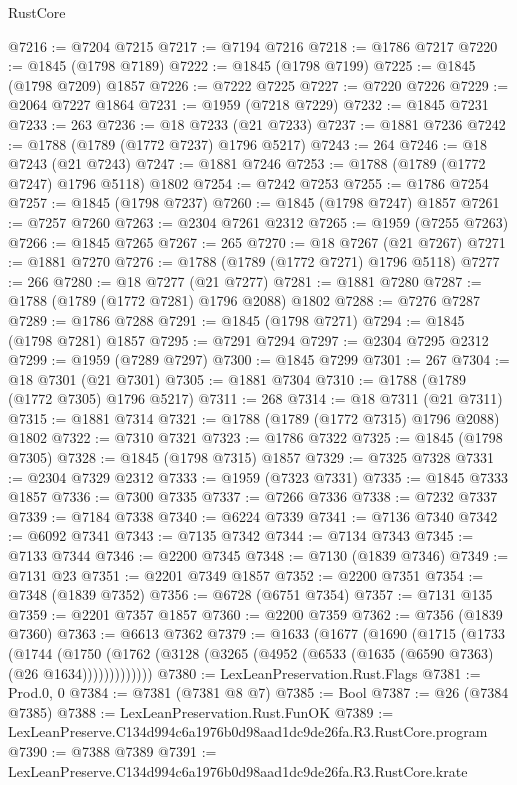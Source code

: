 \begin{lexlean}{RustCore}
\begin{coremodule}
@7216 := @7204 @7215
@7217 := @7194 @7216
@7218 := @1786 @7217
@7220 := @1845 (@1798 @7189)
@7222 := @1845 (@1798 @7199)
@7225 := @1845 (@1798 @7209) @1857
@7226 := @7222 @7225
@7227 := @7220 @7226
@7229 := @2064 @7227 @1864
@7231 := @1959 (@7218 @7229)
@7232 := @1845 @7231
@7233 := 263
@7236 := @18 @7233 (@21 @7233)
@7237 := @1881 @7236
@7242 := @1788 (@1789 (@1772 @7237) @1796 @5217)
@7243 := 264
@7246 := @18 @7243 (@21 @7243)
@7247 := @1881 @7246
@7253 := @1788 (@1789 (@1772 @7247) @1796 @5118) @1802
@7254 := @7242 @7253
@7255 := @1786 @7254
@7257 := @1845 (@1798 @7237)
@7260 := @1845 (@1798 @7247) @1857
@7261 := @7257 @7260
@7263 := @2304 @7261 @2312
@7265 := @1959 (@7255 @7263)
@7266 := @1845 @7265
@7267 := 265
@7270 := @18 @7267 (@21 @7267)
@7271 := @1881 @7270
@7276 := @1788 (@1789 (@1772 @7271) @1796 @5118)
@7277 := 266
@7280 := @18 @7277 (@21 @7277)
@7281 := @1881 @7280
@7287 := @1788 (@1789 (@1772 @7281) @1796 @2088) @1802
@7288 := @7276 @7287
@7289 := @1786 @7288
@7291 := @1845 (@1798 @7271)
@7294 := @1845 (@1798 @7281) @1857
@7295 := @7291 @7294
@7297 := @2304 @7295 @2312
@7299 := @1959 (@7289 @7297)
@7300 := @1845 @7299
@7301 := 267
@7304 := @18 @7301 (@21 @7301)
@7305 := @1881 @7304
@7310 := @1788 (@1789 (@1772 @7305) @1796 @5217)
@7311 := 268
@7314 := @18 @7311 (@21 @7311)
@7315 := @1881 @7314
@7321 := @1788 (@1789 (@1772 @7315) @1796 @2088) @1802
@7322 := @7310 @7321
@7323 := @1786 @7322
@7325 := @1845 (@1798 @7305)
@7328 := @1845 (@1798 @7315) @1857
@7329 := @7325 @7328
@7331 := @2304 @7329 @2312
@7333 := @1959 (@7323 @7331)
@7335 := @1845 @7333 @1857
@7336 := @7300 @7335
@7337 := @7266 @7336
@7338 := @7232 @7337
@7339 := @7184 @7338
@7340 := @6224 @7339
@7341 := @7136 @7340
@7342 := @6092 @7341
@7343 := @7135 @7342
@7344 := @7134 @7343
@7345 := @7133 @7344
@7346 := @2200 @7345
@7348 := @7130 (@1839 @7346)
@7349 := @7131 @23
@7351 := @2201 @7349 @1857
@7352 := @2200 @7351
@7354 := @7348 (@1839 @7352)
@7356 := @6728 (@6751 @7354)
@7357 := @7131 @135
@7359 := @2201 @7357 @1857
@7360 := @2200 @7359
@7362 := @7356 (@1839 @7360)
@7363 := @6613 @7362
@7379 := @1633
    (@1677
      (@1690
        (@1715
          (@1733
            (@1744
              (@1750 (@1762 (@3128 (@3265 (@4952 (@6533 (@1635 (@6590 @7363) (@26 @1634)))))))))))))
@7380 := LexLeanPreservation.Rust.Flags
@7381 := Prod.{0, 0}
@7384 := @7381 (@7381 @8 @7)
@7385 := Bool
@7387 := @26 (@7384 @7385)
@7388 := LexLeanPreservation.Rust.FunOK
@7389 := LexLeanPreserve.C134d994c6a1976b0d98aad1dc9de26fa.R3.RustCore.program
@7390 := @7388 @7389
@7391 := LexLeanPreserve.C134d994c6a1976b0d98aad1dc9de26fa.R3.RustCore.krate

\end{coremodule}
\end{lexlean}

